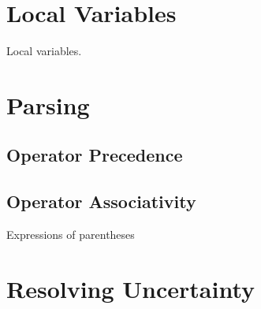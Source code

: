 

\section{Local Variables}
\csharpsubsection{\csharp}

\begin{syntaxfloat}
  
  \caption{Local variables.}
  \label{syntax:prim:vars:locals}
\end{syntaxfloat}


\section{Parsing}
\subsection{Operator Precedence}


\subsection{Operator Associativity}

\csharpsubsection{\csharp}

\begin{syntaxfloat}
  
  \caption{Expressions of parentheses}
  \label{syntax:prim:pars}
\end{syntaxfloat}


\section{Resolving Uncertainty}





